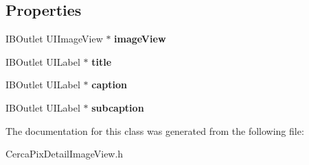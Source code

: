 \subsection*{Properties}
\begin{DoxyCompactItemize}
\item 
\hypertarget{interface_cerca_pix_detail_image_view_abbb5593e9e885b1a67d40e3786c7184c}{I\-B\-Outlet U\-I\-Image\-View $\ast$ {\bfseries image\-View}}\label{interface_cerca_pix_detail_image_view_abbb5593e9e885b1a67d40e3786c7184c}

\item 
\hypertarget{interface_cerca_pix_detail_image_view_ad8e2a512733ae5b649bbca75b2129137}{I\-B\-Outlet U\-I\-Label $\ast$ {\bfseries title}}\label{interface_cerca_pix_detail_image_view_ad8e2a512733ae5b649bbca75b2129137}

\item 
\hypertarget{interface_cerca_pix_detail_image_view_ae3306958a07b62ff7e6fc4eb4be21135}{I\-B\-Outlet U\-I\-Label $\ast$ {\bfseries caption}}\label{interface_cerca_pix_detail_image_view_ae3306958a07b62ff7e6fc4eb4be21135}

\item 
\hypertarget{interface_cerca_pix_detail_image_view_adc15830b541902909e411c7674459c13}{I\-B\-Outlet U\-I\-Label $\ast$ {\bfseries subcaption}}\label{interface_cerca_pix_detail_image_view_adc15830b541902909e411c7674459c13}

\end{DoxyCompactItemize}


The documentation for this class was generated from the following file\-:\begin{DoxyCompactItemize}
\item 
Cerca\-Pix\-Detail\-Image\-View.\-h\end{DoxyCompactItemize}
